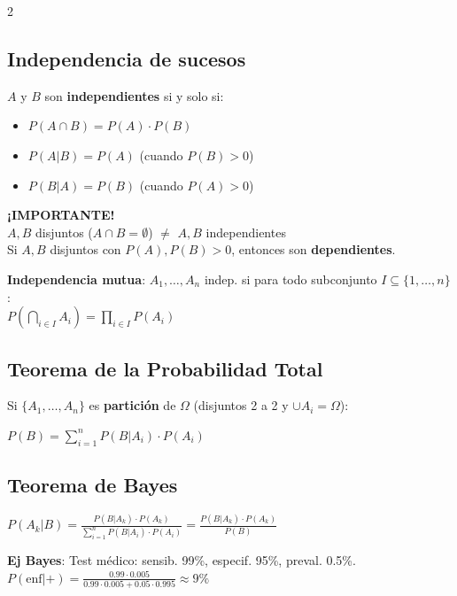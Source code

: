 \documentclass[9pt,a4paper]{article}
\begin{document}
\begin{multicols}{2}
\subsection{Independencia de sucesos}
$A$ y $B$ son \textbf{independientes} si y solo si:
\begin{itemize}[leftmargin=*]
\item $P(A\cap B)=P(A)\cdot P(B)$
\item $P(A|B)=P(A)$ (cuando $P(B)>0$)
\item $P(B|A)=P(B)$ (cuando $P(A)>0$)
\end{itemize}

\begin{alertbox}
\textbf{¡IMPORTANTE!}\\
$A,B$ disjuntos ($A\cap B=\emptyset$) $\neq$ $A,B$ independientes\\
Si $A,B$ disjuntos con $P(A),P(B)>0$, entonces son \textbf{dependientes}.
\end{alertbox}

\textbf{Independencia mutua}: $A_1,\ldots,A_n$ indep. si para todo subconjunto $I\subseteq\{1,\ldots,n\}$:\\
$P(\bigcap_{i\in I}A_i)=\prod_{i\in I}P(A_i)$

\subsection{Teorema de la Probabilidad Total}
Si $\{A_1,\ldots,A_n\}$ es \textbf{partición} de $\Omega$ (disjuntos 2 a 2 y $\cup A_i=\Omega$):
\begin{formulabox}
$P(B)=\sum_{i=1}^{n}P(B|A_i)\cdot P(A_i)$
\end{formulabox}

\subsection{Teorema de Bayes}
\begin{formulabox}
$P(A_k|B)=\frac{P(B|A_k)\cdot P(A_k)}{\sum_{i=1}^{n}P(B|A_i)\cdot P(A_i)}=\frac{P(B|A_k)\cdot P(A_k)}{P(B)}$
\end{formulabox}

\begin{exbox}
\textbf{Ej Bayes}: Test médico: sensib. 99\%, especif. 95\%, preval. 0.5\%.\\
$P(\text{enf}|+)=\frac{0.99\cdot 0.005}{0.99\cdot 0.005+0.05\cdot 0.995}\approx 9\%$
\end{exbox}


\end{multicols}
\end{document}
